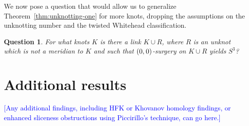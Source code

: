 \documentclass[11pt,usenames,dvipsnames,reqno]{amsart}
\newcommand{\hs}{\hspace{0.05em}} %
\numberwithin{theorem}{section}
\newtheorem{question}[theorem]{Question}
\theoremstyle{ex}
\theoremstyle{rem}
\def\kh#1{\textcolor{Blue}{#1}}
\begin{document}
We now pose a question that would allow us to generalize Theorem~\ref{thm:unknotting-one} for more knots, dropping the assumptions on the unknotting number and the twisted Whitehead classification.

\begin{question}
	For what knots $K$ is there a link $K \cup R$, where $R$ is an unknot which is not a meridian to $K$ and such that $(0,\hs0)$-surgery on $K\cup R$ yields $S^3$?
\end{question}

\section{Additional results}

\kh{[Any additional findings, including HFK or Khovanov homology findings, or enhanced sliceness obstructions using Piccirillo's technique, can go here.]}




\end{document}
